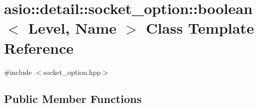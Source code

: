 \hypertarget{classasio_1_1detail_1_1socket__option_1_1boolean}{}\section{asio\+:\+:detail\+:\+:socket\+\_\+option\+:\+:boolean$<$ Level, Name $>$ Class Template Reference}
\label{classasio_1_1detail_1_1socket__option_1_1boolean}


{\ttfamily \#include $<$socket\+\_\+option.\+hpp$>$}

\subsection*{Public Member Functions}
